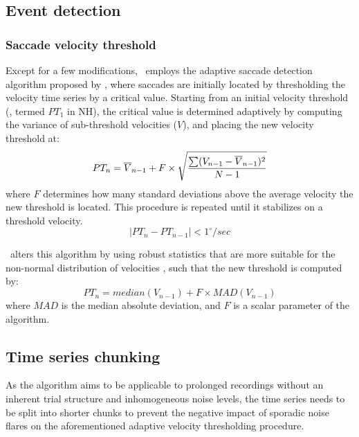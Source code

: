 \subsection*{Event detection}

\subsubsection*{Saccade velocity threshold}

Except for a few modifications, \remodnav\ employs the adaptive saccade
detection algorithm proposed by \cite{Nystrom2010AnData}, where saccades
are initially located by thresholding the velocity time series by a critical
value. Starting from an initial velocity threshold (, termed $PT_1$ in NH), the critical value is determined
adaptively by computing the variance of sub-threshold velocities ($V$), and
placing the new velocity threshold at:
%
\begin{equation}
  PT_n = \overline{V}_{n-1} + F \times \sqrt{{\sum(V_{n-1} -
\overline{V}_{n-1})^2} \over {N-1}}
\end{equation}
%
where $F$ determines how many standard deviations above the average
velocity the new threshold is located.  This procedure is repeated until it
stabilizes on a threshold velocity.
%
\begin{equation}
|PT_n - PT_{n-1}| < 1^\circ/sec
\end{equation}

\remodnav\ alters this algorithm by using robust statistics that are more
suitable for the non-normal distribution of velocities \citep{Friedman2018},
such that the new threshold is computed by:
%
\begin{equation}\label{eq:threshold}
PT_n = median({V}_{n-1}) + F \times MAD({V}_{n-1})
\end{equation}
%
where $MAD$ is the median absolute deviation, and $F$ is a
scalar parameter of the algorithm.

\subsection*{Time series chunking}

As the algorithm aims to be applicable to prolonged recordings without an
inherent trial structure and inhomogeneous noise levels, the time series needs
to be split into shorter chunks to prevent the negative impact of sporadic
noise flares on the aforementioned adaptive velocity thresholding procedure.

